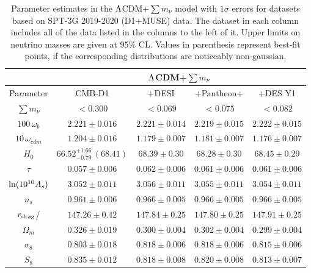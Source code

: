 \documentclass[12pt,a4paper]{article}
\newcommand{\rdrag}{r_{\rm drag}}
\newcommand\?{/\hspace{0pt}}
\def\Mnu{\sum m_\nu}
\begin{document}
\begin{table}
	\renewcommand{\arraystretch}{1.2}
    \small
	\centering
	\begin{tabular} {|c|| c |c | c |c|}
		\hline
		& \multicolumn{4}{c|}{$\rm \Lambda$CDM+$\sum m_\nu$} \\
		\hline
		\hline
		Parameter & CMB-D1 & +DESI & +Pantheon+ & +DES Y1 \\
		\hline
        $\Mnu$ & $<0.300$ &
		$<0.069$ &
		$<0.075$ &
        $<0.082$ \\ 
		$100\,\omega_b$ & $2.221\pm0.016$ &
		$2.221\pm0.014$ &
		$2.219\pm0.015$ &
		$2.222\pm0.015$  \\ %
		$10\,\omega_{cdm}$ & $1.204\pm0.016$ &
		$1.179\pm0.007$ &
		$1.181\pm0.007$ &
		$1.176\pm0.007$ \\ %
		$H_0$ & $66.52^{+1.66}_{-0.79}\,(68.41)$ &
		$68.39\pm0.30$ &
		$68.28\pm0.30$ &
		$68.45\pm0.29$ \\
		$\tau$ & $0.057\pm0.006$ &
		$0.062\pm0.006$ &
		$0.061\pm0.006$ &
		$0.061\pm0.006$ \\ %
		$\!{\rm ln}(10^{10} A_s)\!$ & $3.052\pm0.011$ &
		$3.056\pm0.011$ &
		$3.055\pm0.011$ &
		$3.054\pm0.011$ \\ %
		$n_s$ & $0.961\pm0.006$ &
		$0.966\pm0.005$ &
		$0.966\pm0.005$ &
		$0.966\pm0.005$ \\ %
		\hline   
		$\rdrag$/\text{Mpc} & $147.26\pm0.42$ &
		$147.84\pm0.25$ &
		$147.80\pm0.25$ &
		$147.91\pm0.25$ \\    %
		$\Omega_m$ & $0.326\pm0.019$ &
		$0.300\pm0.004$ &
		$0.302\pm0.004$ &
		$0.299\pm0.004$ \\ %
		$\sigma_8$ & $0.803\pm0.018$ &
		$0.818\pm0.006$ &
		$0.818\pm0.006$ &
		$0.815\pm0.006$ \\ %
		$S_8$ & $0.835\pm0.012$ &
		$0.818\pm0.008$ &
		$0.820\pm0.008$ &
		$0.813\pm0.007$ \\
		\hline
	\end{tabular}
	\caption {Parameter estimates in the $\rm \Lambda$CDM+$\sum m_\nu$ model with $1\sigma$ errors for datasets based on SPT-3G 2019-2020 (D1+MUSE) data. The dataset in each column includes all of the data listed in the columns to the left of it. Upper limits on neutrino masses are given at $95\%$ CL. Values in parenthesis represent best-fit points, if the corresponding distributions are noticeably non-gaussian.}
	\label{tab:3a}
\end{table}
\end{document}
